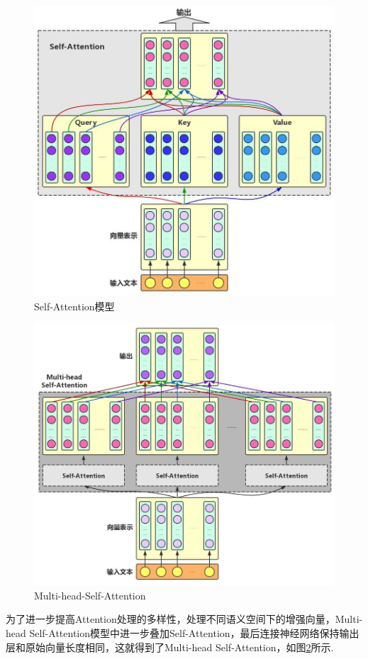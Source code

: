 \documentclass[12pt, a4paper, oneside]{ctexart}
\numberwithin{equation}{section}  %
\begin{document}
\vspace{2cm}
\begin{figure}[htbp]
    \centering
    \includegraphics[scale=0.4]{../NLP大作业note.figure/Self-Attention.png}
    \caption{Self-Attention模型}
    \label{fig-self-attention}
\end{figure}

\clearpage
\begin{figure}
\centering
\hspace{-3cm}
\includegraphics[scale=0.4]{../NLP大作业note.figure/Multi-head Self-Attention.jpg}
\captionsetup{justification=raggedright, singlelinecheck=false}
\caption{Multi-head-Self-Attention}
\label{fig-multi-head-self-attention}
\end{figure}
为了进一步提高Attention处理的多样性，处理不同语义空间下的增强向量，Multi-head Self-Attention模型中进一步叠加Self-Attention，最后连接神经网络保持输出层和原始向量长度相同，这就得到了Multi-head Self-Attention，如图\ref{fig-multi-head-self-attention}所示.
\end{document}
